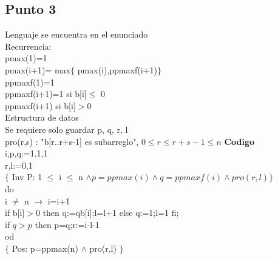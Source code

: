 \documentclass{article}
\newcommand\tab[1][1cm]{\hspace*{#1}}
\begin{document}
\subsection*{Punto 3}
Lenguaje se encuentra en el enunciado\\
Recurrencia:\\
pmax(1)=1\\
pmax(i+1)= max$\{$ pmax(i),ppmaxf(i+1)$\}$\\
ppmaxf(1)=1\\
ppmaxf(i+1)=1 si b[i]$\leq$ 0\\
\tab ppmaxf(i+1) si b[i]$>$0\\
Estructura de datos\\
Se requiere solo guardar p, q, r, l \\
pro(r,s) : "b[r..r+s-1] es subarreglo", $0\leq r \leq r+s-1 \leq n$
\textbf{Codigo}\\
i,p,q:=1,1,1\\
r,l:=0,1\\
$\{$ Inv P: 1 $\leq$ i $\leq$ n $\wedge p=ppmax(i) \wedge q = ppmaxf(i) \wedge pro(r,l) \}$\\ 
do \\
\tab i $\neq$ n $\rightarrow$ i=i+1\\
\tab \tab if b[i]$>0$ then q:=qb[i];l=l+1 else q:=1;l=1 fi;\\
\tab \tab if $q>p$ then p=q;r:=i-l-1\\
od\\
$\{$ Pos: p=ppmax(n) $\wedge$ pro(r,l) $\}$
\end{document}
